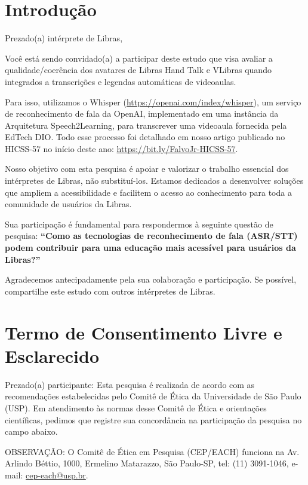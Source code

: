 \section{Introdução}

\noindent
Prezado(a) intérprete de Libras,

\noindent
Você está sendo convidado(a) a participar deste estudo que visa avaliar a 
qualidade/coerência dos avatares de Libras Hand Talk e VLibras quando integrados a 
transcrições e legendas automáticas de videoaulas.

\noindent
Para isso, utilizamos o Whisper (\url{https://openai.com/index/whisper}), um serviço de reconhecimento de fala da OpenAI, implementado em uma instância da Arquitetura Speech2Learning, para transcrever uma videoaula fornecida pela EdTech DIO. Todo esse processo foi detalhado em nosso artigo publicado no HICSS-57 no início deste ano: \url{https://bit.ly/FalvoJr-HICSS-57}.

\noindent
Nosso objetivo com esta pesquisa é apoiar e valorizar o trabalho essencial dos 
intérpretes de Libras, não substituí-los. Estamos dedicados a desenvolver soluções que 
ampliem a acessibilidade e facilitem o acesso ao conhecimento para toda a comunidade 
de usuários da Libras.

\noindent
Sua participação é fundamental para respondermos à seguinte questão de pesquisa: 
\textbf{``Como as tecnologias de reconhecimento de fala (ASR/STT) podem contribuir para uma 
educação mais acessível para usuários da Libras?''}

\noindent
Agradecemos antecipadamente pela sua colaboração e participação. Se possível, 
compartilhe este estudo com outros intérpretes de Libras.

\section{Termo de Consentimento Livre e Esclarecido}

\noindent
Prezado(a) participante: Esta pesquisa é realizada de acordo com as recomendações 
estabelecidas pelo Comitê de Ética da Universidade de São Paulo (USP). Em atendimento às 
normas desse Comitê de Ética e orientações científicas, pedimos que registre sua 
concordância na participação da pesquisa no campo abaixo.

\noindent
OBSERVAÇÃO: O Comitê de Ética em Pesquisa (CEP/EACH) funciona na Av. Arlindo Béttio, 
1000, Ermelino Matarazzo, São Paulo-SP, tel: (11) 3091-1046, e-mail: \href{mailto:cep-each@usp.br}{cep-each@usp.br}.

